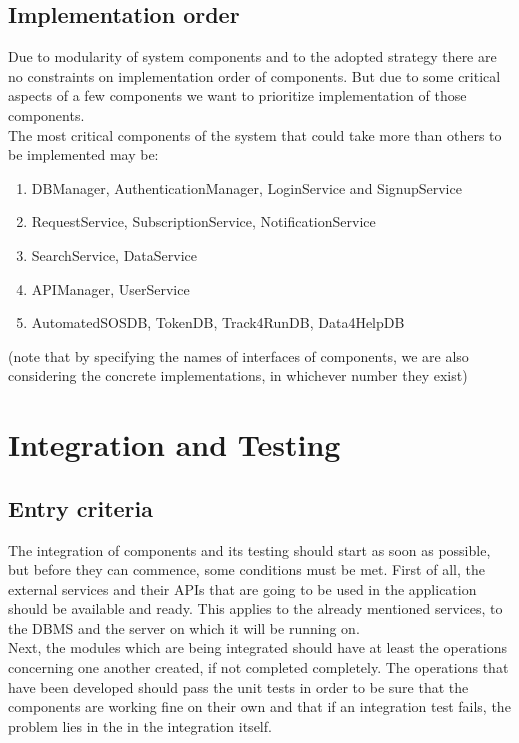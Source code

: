 \documentclass[a4paper, hidelinks, 12pt]{report}
\begin{document}
\subsection{Implementation order}
Due to modularity of system components and to the adopted strategy there are no constraints on implementation order of components. But due to some critical aspects of a few components we want to prioritize implementation of those components.\\

The most critical components of the system that could take more than others to be implemented may be:
\begin{enumerate}
\item{} DBManager, AuthenticationManager, LoginService and SignupService
\item{} RequestService, SubscriptionService, NotificationService
\item{} SearchService, DataService
\item{} APIManager, UserService
\item{} AutomatedSOSDB, TokenDB, Track4RunDB, Data4HelpDB
\end{enumerate}
(note that by specifying the names of interfaces of components, we are also considering the concrete implementations, in whichever number they exist)\\

\section{Integration and Testing}
\subsection{Entry criteria} 
The integration of components and its testing should start as soon as possible, but before they can commence, some conditions must be met. First of all, the external services and their APIs that are going to be used in the application should be available and ready. This applies to the already mentioned services, to the DBMS and the server on which it will be running on. \\

Next, the modules which are being integrated should have at least the operations concerning one another created, if not completed completely. The operations that have been developed should pass the unit tests in order to be sure that the components are working fine on their own and that if an integration test fails, the problem lies in the in the integration itself.\\
\end{document}
